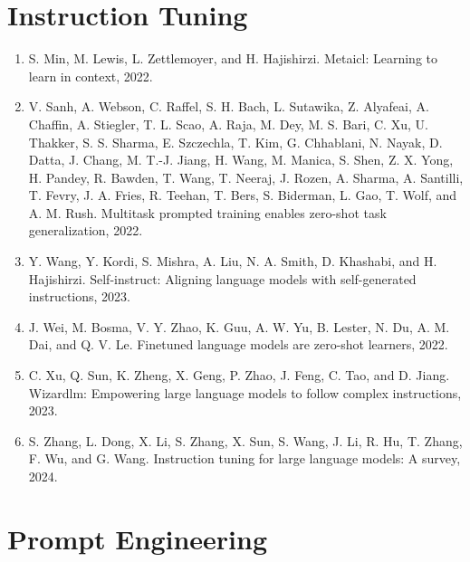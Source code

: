 \documentclass[]{article}
\begin{document}
\section{Instruction Tuning}
\begin{enumerate}
\item S. Min, M. Lewis, L. Zettlemoyer, and H. Hajishirzi. Metaicl: Learning to learn in context, 2022.
\item V. Sanh, A. Webson, C. Raffel, S. H. Bach, L. Sutawika, Z. Alyafeai, A. Chaffin, A. Stiegler, T. L. Scao,
A. Raja, M. Dey, M. S. Bari, C. Xu, U. Thakker, S. S. Sharma, E. Szczechla, T. Kim, G. Chhablani,
N. Nayak, D. Datta, J. Chang, M. T.-J. Jiang, H. Wang, M. Manica, S. Shen, Z. X. Yong, H. Pandey,
R. Bawden, T. Wang, T. Neeraj, J. Rozen, A. Sharma, A. Santilli, T. Fevry, J. A. Fries, R. Teehan,
T. Bers, S. Biderman, L. Gao, T. Wolf, and A. M. Rush. Multitask prompted training enables zero-shot
task generalization, 2022.
\item Y. Wang, Y. Kordi, S. Mishra, A. Liu, N. A. Smith, D. Khashabi, and H. Hajishirzi. Self-instruct:
Aligning language models with self-generated instructions, 2023.
\item J. Wei, M. Bosma, V. Y. Zhao, K. Guu, A. W. Yu, B. Lester, N. Du, A. M. Dai, and Q. V. Le. Finetuned
language models are zero-shot learners, 2022.
\item C. Xu, Q. Sun, K. Zheng, X. Geng, P. Zhao, J. Feng, C. Tao, and D. Jiang. Wizardlm: Empowering
large language models to follow complex instructions, 2023.
\item S. Zhang, L. Dong, X. Li, S. Zhang, X. Sun, S. Wang, J. Li, R. Hu, T. Zhang, F. Wu, and G. Wang.
Instruction tuning for large language models: A survey, 2024.


\end{enumerate}

\section{Prompt Engineering}
\begin{enumerate}

\end{enumerate}
\end{document}
